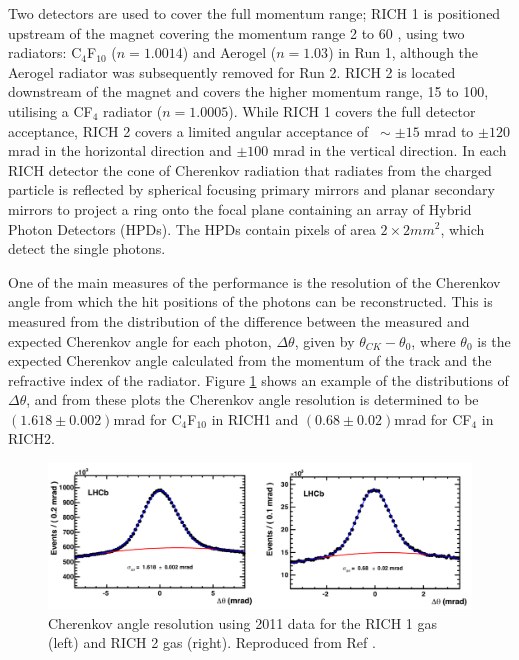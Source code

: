 Two \rich detectors are used to cover the full \lhcb momentum range; RICH 1 is positioned upstream of the magnet covering the momentum range 2 to 60 \gevc, using two radiators: C$_4$F$_{10}$ ($n = 1.0014$) and Aerogel ($n = 1.03$) in Run 1, although the Aerogel radiator was subsequently removed for Run 2. RICH 2 is located downstream of the magnet and covers the higher momentum range, 15 to 100\gevc, utilising a CF$_4$ radiator ($n = 1.0005$). While RICH 1 covers the full detector acceptance, RICH 2 covers a limited angular acceptance of $~\sim \pm 15$ mrad to $\pm 120$ mrad in the horizontal direction and $\pm 100$ mrad in the vertical direction. In each RICH detector the cone of Cherenkov radiation that radiates from the charged particle is reflected by spherical focusing primary mirrors and planar secondary mirrors to project a ring onto the focal plane containing an array of Hybrid Photon Detectors (HPDs). The HPDs contain pixels of area $2\times 2 mm^2$, which detect the single photons.

One of the main measures of the \rich performance is the resolution of the Cherenkov angle from which the hit positions of the photons can be reconstructed. This is measured from the distribution of the difference between the measured and expected Cherenkov angle for each photon, $\Delta\theta$, given by $\theta_{CK} - \theta_0$, where $\theta_0$ is the expected Cherenkov angle calculated from the momentum of the track and the refractive index of the radiator. Figure \ref{cherenkov} shows an example of the distributions of $\Delta\theta$, and from these plots the Cherenkov angle resolution is determined to be $(1.618 \pm 0.002)$mrad for C$_4$F$_{10}$ in RICH1 and $(0.68 \pm 0.02)$mrad for CF$_4$ in RICH2.

\begin{figure}
\includegraphics[width=\linewidth]{figures/detector/cherenkov.pdf}
\caption{Cherenkov angle resolution using 2011 data for the RICH 1 gas (left) and RICH 2 gas (right). Reproduced from Ref \cite{LHCb-DP-2012-003}.}
\label{cherenkov}
\end{figure}

